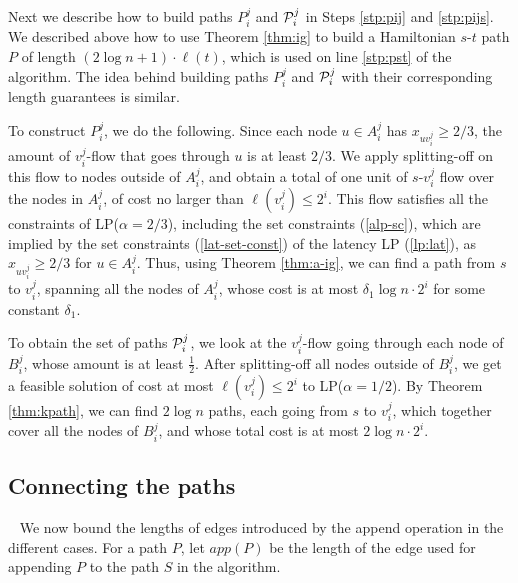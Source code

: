 \documentclass[11pt]{article}
\begin{document}
Next we describe how to build paths $P^j_i$ and ${\cal P}^j_i$ in Steps \ref{stp:pij} and \ref{stp:pijs}. We described above how to use Theorem \ref{thm:ig} to build a Hamiltonian $s$-$t$ path $P$ of length $(2 \log n+1)\cdot \ell(t)$, which is used on line \ref{stp:pst} of the algorithm.  The idea behind building paths $P^j_i$ and ${\cal P}^j_i$ with their corresponding length guarantees is similar.

To construct $P^j_i$, we do the following.
Since each node $u\in A^j_i$ has $x_{uv^j_i} \geq 2/3$,  the amount of ${v^j_i}$-flow
that goes through $u$ is at least $2/3$. We apply splitting-off on this flow to nodes outside of  $A^j_i$, and obtain a total of one unit of $s$-$v^j_i$ flow over the nodes in $A^j_i$, of cost no larger than $\ell(v^j_i)\leq 2^i$. This flow satisfies all the constraints of LP($\alpha=2/3$), including the set constraints (\ref{alp-sc}), which are implied by the set constraints (\ref{lat-set-const}) of the latency LP (\ref{lp:lat}), as $x_{uv^j_i}\geq 2/3$ for $u\in A^j_i$.
Thus, using Theorem \ref{thm:a-ig}, we can find a path from $s$ to $v^j_i$, spanning
all the nodes of $A^j_i$, whose cost is at most $\delta_1 \log n \cdot 2^i$ for some constant $\delta_1$.

To obtain the set of paths ${\cal P}^j_i$, we look at the $v^j_i$-flow going through each node of $B^j_i$, whose amount is at least $\frac{1}{2}$. After splitting-off all nodes outside of $B^j_i$, we get a feasible solution of cost at most $\ell(v^j_i)\leq 2^i$ to LP($\alpha = 1/2$). 
By Theorem \ref{thm:kpath}, we can find 
$2 \log n$ paths, each going from $s$ to $v^j_i$, which together cover all the nodes of $B^j_i$, and whose total cost is at most $2 \log n\cdot 2^i$.

\subsection{Connecting the paths}~
We now bound the lengths of edges introduced by the append operation in the different cases. For a path $P$,
let $app(P)$ be the length of the edge used for appending $P$ to the path $S$ in the algorithm.
\end{document}
